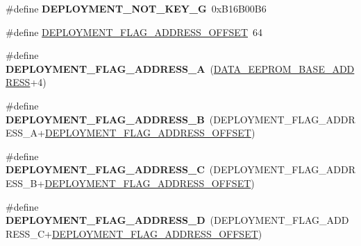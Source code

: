\begin{DoxyCompactItemize}
\item 
\hypertarget{group__eps__non__volatile__mem__handling_gabef4b8f33a33e841b48b915be912912c}{\#define {\bfseries D\-E\-P\-L\-O\-Y\-M\-E\-N\-T\-\_\-\-N\-O\-T\-\_\-\-K\-E\-Y\-\_\-\-G}~0x\-B16\-B00\-B6}\label{group__eps__non__volatile__mem__handling_gabef4b8f33a33e841b48b915be912912c}

\item 
\#define \hyperlink{group__eps__non__volatile__mem__handling_gac44959ceff397100af805c87122a0de4}{D\-E\-P\-L\-O\-Y\-M\-E\-N\-T\-\_\-\-F\-L\-A\-G\-\_\-\-A\-D\-D\-R\-E\-S\-S\-\_\-\-O\-F\-F\-S\-E\-T}~64
\item 
\hypertarget{group__eps__non__volatile__mem__handling_ga9bae70ea267a0ca55498e52cb20d548a}{\#define {\bfseries D\-E\-P\-L\-O\-Y\-M\-E\-N\-T\-\_\-\-F\-L\-A\-G\-\_\-\-A\-D\-D\-R\-E\-S\-S\-\_\-\-A}~(\hyperlink{group__eps__non__volatile__mem__handling_gaae76a8f2af728d5113e2cee5f525642c}{D\-A\-T\-A\-\_\-\-E\-E\-P\-R\-O\-M\-\_\-\-B\-A\-S\-E\-\_\-\-A\-D\-D\-R\-E\-S\-S}+4)}\label{group__eps__non__volatile__mem__handling_ga9bae70ea267a0ca55498e52cb20d548a}

\item 
\hypertarget{group__eps__non__volatile__mem__handling_ga78ca6baeeaacac2a322222b95aeae75d}{\#define {\bfseries D\-E\-P\-L\-O\-Y\-M\-E\-N\-T\-\_\-\-F\-L\-A\-G\-\_\-\-A\-D\-D\-R\-E\-S\-S\-\_\-\-B}~(D\-E\-P\-L\-O\-Y\-M\-E\-N\-T\-\_\-\-F\-L\-A\-G\-\_\-\-A\-D\-D\-R\-E\-S\-S\-\_\-\-A+\hyperlink{group__eps__non__volatile__mem__handling_gac44959ceff397100af805c87122a0de4}{D\-E\-P\-L\-O\-Y\-M\-E\-N\-T\-\_\-\-F\-L\-A\-G\-\_\-\-A\-D\-D\-R\-E\-S\-S\-\_\-\-O\-F\-F\-S\-E\-T})}\label{group__eps__non__volatile__mem__handling_ga78ca6baeeaacac2a322222b95aeae75d}

\item 
\hypertarget{group__eps__non__volatile__mem__handling_gac381787362aa9f9c49129691200b84fe}{\#define {\bfseries D\-E\-P\-L\-O\-Y\-M\-E\-N\-T\-\_\-\-F\-L\-A\-G\-\_\-\-A\-D\-D\-R\-E\-S\-S\-\_\-\-C}~(D\-E\-P\-L\-O\-Y\-M\-E\-N\-T\-\_\-\-F\-L\-A\-G\-\_\-\-A\-D\-D\-R\-E\-S\-S\-\_\-\-B+\hyperlink{group__eps__non__volatile__mem__handling_gac44959ceff397100af805c87122a0de4}{D\-E\-P\-L\-O\-Y\-M\-E\-N\-T\-\_\-\-F\-L\-A\-G\-\_\-\-A\-D\-D\-R\-E\-S\-S\-\_\-\-O\-F\-F\-S\-E\-T})}\label{group__eps__non__volatile__mem__handling_gac381787362aa9f9c49129691200b84fe}

\item 
\hypertarget{group__eps__non__volatile__mem__handling_gafdd4be08e849a8d7d0f31d899905aae9}{\#define {\bfseries D\-E\-P\-L\-O\-Y\-M\-E\-N\-T\-\_\-\-F\-L\-A\-G\-\_\-\-A\-D\-D\-R\-E\-S\-S\-\_\-\-D}~(D\-E\-P\-L\-O\-Y\-M\-E\-N\-T\-\_\-\-F\-L\-A\-G\-\_\-\-A\-D\-D\-R\-E\-S\-S\-\_\-\-C+\hyperlink{group__eps__non__volatile__mem__handling_gac44959ceff397100af805c87122a0de4}{D\-E\-P\-L\-O\-Y\-M\-E\-N\-T\-\_\-\-F\-L\-A\-G\-\_\-\-A\-D\-D\-R\-E\-S\-S\-\_\-\-O\-F\-F\-S\-E\-T})}\label{group__eps__non__volatile__mem__handling_gafdd4be08e849a8d7d0f31d899905aae9}


\end{DoxyCompactItemize}
